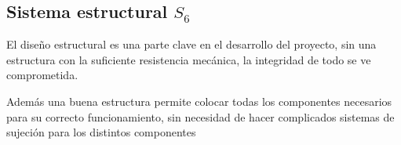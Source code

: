 \subsection{Sistema estructural $S_6$}

El diseño estructural es una parte clave en el desarrollo del proyecto, sin una estructura con la suficiente resistencia mecánica, la integridad de todo se ve comprometida.

Además una buena estructura permite colocar todas los componentes necesarios para su correcto funcionamiento, sin necesidad de hacer complicados sistemas de sujeción para los distintos componentes





